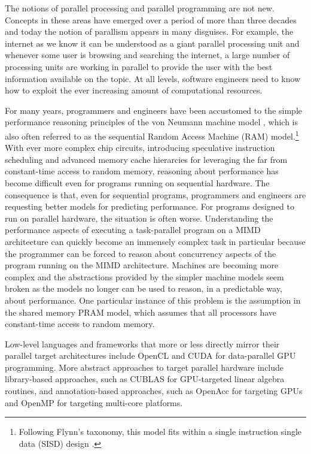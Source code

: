 \documentclass[11pt]{book}
\begin{document}
The notions of parallel processing and parallel programming are not
new. Concepts in these areas have emerged over a period of more than three
decades and today the notion of parallism appears in many
disguises. For example, the internet as we know it can be understood
as a giant parallel processing unit and whenever some user is browsing
and searching the internet, a large number of processing units are
working in parallel to provide the user with the best information
available on the topic. At all levels, software engineers need to know
how to exploit the ever increasing amount of computational resources.

For many years, programmers and engineers have been accustomed to the
simple performance reasoning principles of the von Neumann machine
model \cite{vonneumann1945}, which is also often referred to as the
sequential Random Access Machine (RAM) model.\footnote{Following
  Flynn's taxonomy, this model fits within a single instruction single
  data (SISD) design \cite{Flynn1972}.} With ever more complex chip
circuits, introducing speculative instruction scheduling and advanced
memory cache hierarcies for leveraging the far from constant-time
access to random memory, reasoning about performance has become
difficult even for programs running on sequential hardware. The
consequence is that, even for sequential programs, programmers and
engineers are requesting better models for predicting performance. For
programs designed to run on parallel hardware, the situation is often
worse. Understanding the performance aspects of executing a
task-parallel program on a MIMD architecture can quickly become an
immensely complex task in particular because the programmer can be
forced to reason about concurrency aspects of the program running on
the MIMD architecture. Machines are becoming more complex and the
abstractions provided by the simpler machine models seem broken as the
models no longer can be used to reason, in a predictable way, about
performance. One particular instance of this problem is the assumption
in the shared memory PRAM model, which assumes that all processors
have constant-time access to random memory.

Low-level languages and frameworks that more or less directly mirror
their parallel target architectures include OpenCL \cite{opencl2011}
and CUDA \cite{Nickolls:2008:SPP:1365490.1365500} for data-parallel
GPU programming. More abstract approaches to target parallel hardware
include library-based approaches, such as CUBLAS for GPU-targeted
linear algebra routines, and annotation-based approaches, such as
OpenAcc for targeting GPUs and OpenMP for targeting multi-core
platforms.
\end{document}
